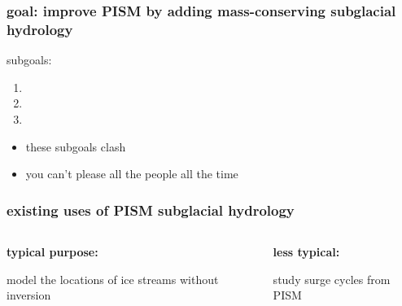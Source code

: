 \documentclass[hide notes,intlimits]{beamer}
\begin{document}
\begin{frame}
  \frametitle{goal: improve PISM by adding mass-conserving subglacial hydrology}

subgoals:

\begin{enumerate}
  \item {}
  \item {}
  \item {}
\end{enumerate}

\bigskip
\begin{itemize}
  \item<2-3> these subgoals clash
  \item<3> you can't please all the people all the time
\end{itemize}
\end{frame}


\begin{frame}
  \frametitle{existing uses of PISM subglacial hydrology}

\begin{columns}
\begin{column}{0.5\textwidth}
\begin{center}
\textbf{typical purpose:}


model the locations of ice streams without inversion
\end{center}
\end{column}
\begin{column}{0.5\textwidth}
\begin{center}
\textbf{less typical:}


study surge cycles from PISM
\end{center}
\end{column}
\end{columns}
\end{frame}
\end{document}
